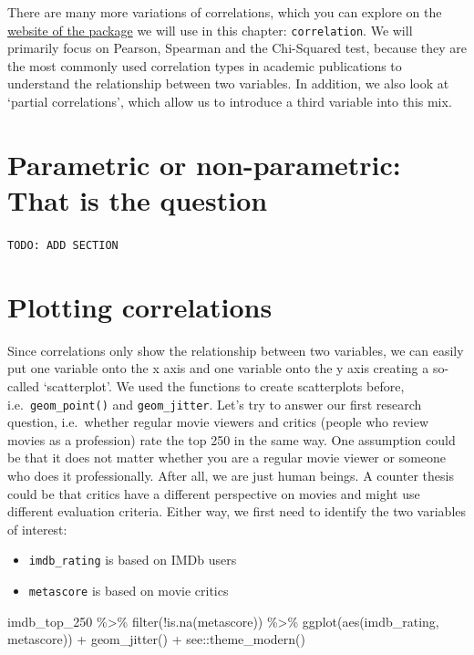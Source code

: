 \documentclass[
]{book}
\newenvironment{Shaded}{\begin{snugshade}}{\end{snugshade}}
\newcommand{\FunctionTok}[1]{\textcolor[rgb]{0.00,0.00,0.00}{#1}}
\newcommand{\NormalTok}[1]{#1}
\newcommand{\SpecialCharTok}[1]{\textcolor[rgb]{0.00,0.00,0.00}{#1}}
\begin{document}
There are many more variations of correlations, which you can explore on the \href{https://easystats.github.io/correlation/articles/types.html}{website of the package} we will use in this chapter: \texttt{correlation}. We will primarily focus on Pearson, Spearman and the Chi-Squared test, because they are the most commonly used correlation types in academic publications to understand the relationship between two variables. In addition, we also look at `partial correlations', which allow us to introduce a third variable into this mix.

\hypertarget{parametric-or-non-parametric}{%
\section{Parametric or non-parametric: That is the question}\label{parametric-or-non-parametric}}

\texttt{TODO:\ ADD\ SECTION}

\hypertarget{plotting-correlations}{%
\section{Plotting correlations}\label{plotting-correlations}}

Since correlations only show the relationship between two variables, we can easily put one variable onto the x axis and one variable onto the y axis creating a so-called `scatterplot'. We used the functions to create scatterplots before, i.e.~\texttt{geom\_point()} and \texttt{geom\_jitter}. Let's try to answer our first research question, i.e.~whether regular movie viewers and critics (people who review movies as a profession) rate the top 250 in the same way. One assumption could be that it does not matter whether you are a regular movie viewer or someone who does it professionally. After all, we are just human beings. A counter thesis could be that critics have a different perspective on movies and might use different evaluation criteria. Either way, we first need to identify the two variables of interest:

\begin{itemize}
\item
  \texttt{imdb\_rating} is based on IMDb users
\item
  \texttt{metascore} is based on movie critics
\end{itemize}

\begin{Shaded}
\begin{Highlighting}[]
\NormalTok{imdb\_top\_250 }\SpecialCharTok{\%\textgreater{}\%}
  \FunctionTok{filter}\NormalTok{(}\SpecialCharTok{!}\FunctionTok{is.na}\NormalTok{(metascore)) }\SpecialCharTok{\%\textgreater{}\%} 
  \FunctionTok{ggplot}\NormalTok{(}\FunctionTok{aes}\NormalTok{(imdb\_rating, metascore)) }\SpecialCharTok{+}
  \FunctionTok{geom\_jitter}\NormalTok{() }\SpecialCharTok{+}
\NormalTok{  see}\SpecialCharTok{::}\FunctionTok{theme\_modern}\NormalTok{()}
\end{Highlighting}
\end{Shaded}
\end{document}
